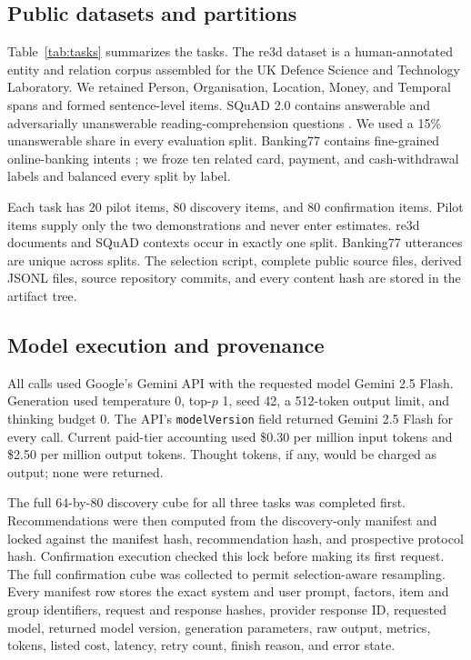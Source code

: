 \documentclass[11pt,a4paper]{article}
\begin{document}
\subsection{Public datasets and partitions}

Table~\ref{tab:tasks} summarizes the tasks. The re3d dataset \citep{dstlre3d} is a human-annotated entity and relation corpus assembled for the UK Defence Science and Technology Laboratory. We retained Person, Organisation, Location, Money, and Temporal spans and formed sentence-level items. SQuAD 2.0 contains answerable and adversarially unanswerable reading-comprehension questions \citep{rajpurkar2018know}. We used a 15\% unanswerable share in every evaluation split. Banking77 contains fine-grained online-banking intents \citep{casanueva2020efficient}; we froze ten related card, payment, and cash-withdrawal labels and balanced every split by label.

Each task has 20 pilot items, 80 discovery items, and 80 confirmation items. Pilot items supply only the two demonstrations and never enter estimates. re3d documents and SQuAD contexts occur in exactly one split. Banking77 utterances are unique across splits. The selection script, complete public source files, derived JSONL files, source repository commits, and every content hash are stored in the artifact tree.



\subsection{Model execution and provenance}

All calls used Google's Gemini API with the requested model Gemini 2.5 Flash. Generation used temperature 0, top-$p$ 1, seed 42, a 512-token output limit, and thinking budget 0. The API's \texttt{modelVersion} field returned Gemini 2.5 Flash for every call. Current paid-tier accounting used \$0.30 per million input tokens and \$2.50 per million output tokens. Thought tokens, if any, would be charged as output; none were returned.

The full 64-by-80 discovery cube for all three tasks was completed first. Recommendations were then computed from the discovery-only manifest and locked against the manifest hash, recommendation hash, and prospective protocol hash. Confirmation execution checked this lock before making its first request. The full confirmation cube was collected to permit selection-aware resampling. Every manifest row stores the exact system and user prompt, factors, item and group identifiers, request and response hashes, provider response ID, requested model, returned model version, generation parameters, raw output, metrics, tokens, listed cost, latency, retry count, finish reason, and error state.
\end{document}
